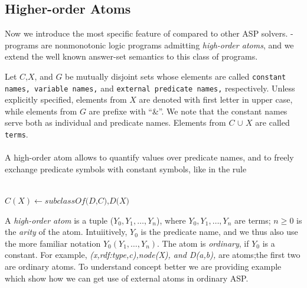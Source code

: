\documentclass[14pt,a4paper, titlepage]{article}
\begin{document}
\subsection{Higher-order Atoms}
Now we introduce the most specific feature of \dlvhex{} 
compared to other ASP solvers. \hex{}-programs are 
nonmonotonic logic programs admitting \emph{high-order 
atoms}, and we extend the well known answer-set semantics 
to this class of programs.

Let $C$,$X$, and $G$ be mutually disjoint sets whose 
elements are called \texttt{constant names, variable 
names,} and \texttt{external predicate names,} 
respectively. Unless explicitly specified, elements from 
\texttt{$X$} are denoted with first letter in upper case, 
while elements from \texttt{$G$} are prefixe with 
\enquote{\&}. 
We note that the constant names serve both as individual 
and predicate names. Elements from \texttt{$C$} $\cup$ 
\texttt{$X$} are called \texttt{terms}. \\ \\A high-order 
atom allows to quantify values over predicate names, and to 
freely exchange predicate symbols with constant symbols, 
like in the rule\\ \centerline{\\$C(X) \leftarrow 
\textit{subclassOf(D,C),D(X)}$}
A \textit{high-order atom} is a tuple ($Y_0, Y_1,
\dots,Y_n$), where $Y_0, Y_1,\dots,Y_n$ are terms; $ n \ge 
0$ is the \textit{arity} of the atom. Intuiitively, $Y_0$ 
is the predicate name, and we thus also use the more 
familiar notation $Y_0(Y_1,\dots,Y_n)$. The atom is 
\textit{ordinary}, if $Y_0$ is a constant. For example, 
\textit{(x,rdf:type,c),node(X), and D(a,b),} are atoms;the 
first two are ordinary atoms. To understand concept better 
we are providing example which show how we can get use of 
external atoms in ordinary ASP.
\end{document}
